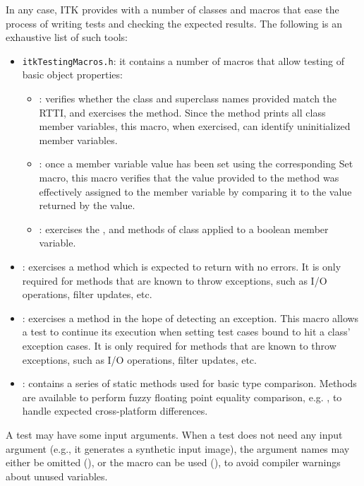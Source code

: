 In any case, ITK provides with a number of classes and macros that ease the
process of writing tests and checking the expected results. The following is an
exhaustive list of such tools:
\begin{itemize}
\item \texttt{itkTestingMacros.h}: it contains a number of macros that allow
testing of basic object properties:
\begin{itemize}
\item {}: verifies whether the class and
superclass names provided match the RTTI, and exercises the 
method. Since the  method prints all class member variables,
this macro, when exercised, can identify uninitialized member variables.
\item {}: once a member variable value has been set
using the corresponding Set macro, this macro verifies that the value provided
to the  method was effectively assigned to the member variable
by comparing it to the value returned by the  value.
\item {}: exercises the ,
and  methods of class applied to a boolean member variable.
\end{itemize}
\item {}: exercises a method which is expected to
return with no errors. It is only required for methods that are known to throw
exceptions, such as I/O operations, filter updates, etc.
\item {}: exercises a method in the hope of detecting
an exception. This macro allows a test to continue its execution when setting
test cases bound to hit a class' exception cases. It is only required for
methods that are known to throw exceptions, such as I/O operations, filter
updates, etc.
\item {}: contains a series of static methods used for basic
type comparison. Methods are available to perform fuzzy floating point equality
comparison, e.g. , to handle expected
cross-platform differences.
\end{itemize}

A test may have some input arguments. When a test does not need any input
argument (e.g., it generates a synthetic input image), the 
argument names may either be omitted (), or the macro can be used (),
to avoid compiler warnings about unused variables.

